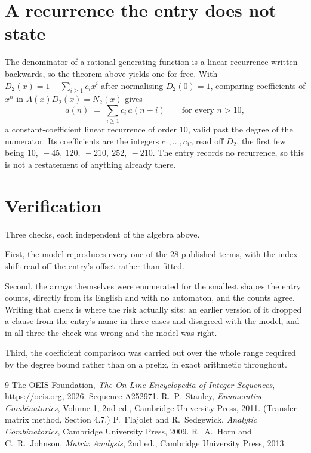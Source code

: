 \documentclass[11pt,a4paper]{article}
\theoremstyle{plain}
\theoremstyle{definition}
\begin{document}
\section{A recurrence the entry does not state}

The denominator of a rational generating function is a linear recurrence written backwards, so
the theorem above yields one for free. With $D_2(x)=1-\sum_{i\ge1}c_ix^i$ after normalising
$D_2(0)=1$, comparing coefficients of $x^n$ in $A(x)D_2(x)=N_2(x)$ gives
\[
a(n)\;=\;\sum_{i\ge1}c_i\,a(n-i)\qquad\text{for every }n>10,
\]
a constant-coefficient linear recurrence of order $10$, valid past the degree of the
numerator. Its coefficients are the integers $c_1,\dots,c_{10}$ read off $D_2$, the first few being $10,\ -45,\ 120,\ -210,\ 252,\ -210$. The entry records no recurrence, so this is not a restatement of anything
already there.

\section{Verification}

Three checks, each independent of the algebra above.

First, the model reproduces every one of the $28$ published terms, with the index shift
read off the entry's offset rather than fitted.

Second, the arrays themselves were enumerated for the smallest shapes the entry counts,
directly from its English and with no automaton, and the counts agree. Writing that check is
where the risk actually sits: an earlier version of it dropped a clause from the entry's name
in three cases and disagreed with the model, and in all three the check was wrong and the model
was right.

Third, the coefficient comparison was carried out over the whole range required by the degree
bound rather than on a prefix, in exact arithmetic throughout.

\begin{thebibliography}{9}
 The OEIS Foundation, \emph{The On-Line Encyclopedia of Integer
Sequences}, \url{https://oeis.org}, 2026. Sequence A252971.
 R.~P.~Stanley, \emph{Enumerative Combinatorics}, Volume 1, 2nd ed.,
Cambridge University Press, 2011. (Transfer-matrix method, Section 4.7.)
 P.~Flajolet and R.~Sedgewick, \emph{Analytic Combinatorics}, Cambridge
University Press, 2009.
 R.~A.~Horn and C.~R.~Johnson, \emph{Matrix Analysis}, 2nd ed., Cambridge
University Press, 2013.
\end{thebibliography}
\end{document}
